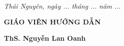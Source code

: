 \vspace{0.8cm}

\begin{center}
	\makebox[0.90\textwidth]{\dotfill}\\[0.65cm]
	\makebox[0.90\textwidth]{\dotfill}\\[0.65cm]
	\makebox[0.90\textwidth]{\dotfill}\\[0.65cm]
	\makebox[0.90\textwidth]{\dotfill}\\[0.65cm]
	\makebox[0.90\textwidth]{\dotfill}\\[0.65cm]
	\makebox[0.90\textwidth]{\dotfill}\\[0.65cm]
	\makebox[0.90\textwidth]{\dotfill}\\[0.65cm]
	\makebox[0.90\textwidth]{\dotfill}\\[0.65cm]
	\makebox[0.90\textwidth]{\dotfill}\\[0.65cm]
	\makebox[0.90\textwidth]{\dotfill}\\[0.65cm]
	\makebox[0.90\textwidth]{\dotfill}\\[0.65cm]
	\makebox[0.90\textwidth]{\dotfill}
\end{center}

\vfill

\hspace*{6cm}
\begin{minipage}{7cm}
	\centering
	
	\textit{Thái Nguyên, ngày ... tháng ... năm ...}
	
	\vspace{0.5cm}
	
	{\bfseries GIÁO VIÊN HƯỚNG DẪN}
	
	\vspace{2.5cm}
	
	{\bfseries ThS. Nguyễn Lan Oanh}
	
\end{minipage}